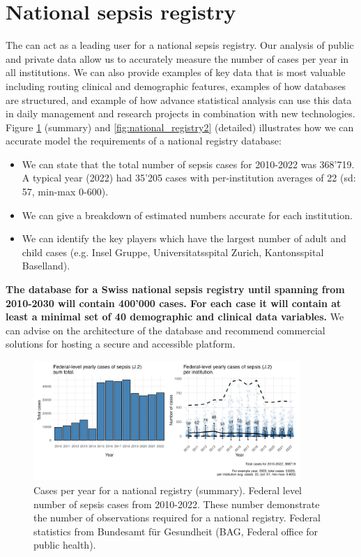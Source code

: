 

\section{National sepsis registry}
The \pmu can act as a leading user for a national sepsis registry.
Our analysis of public and private data allow us to accurately measure the number of cases per year in all institutions.
We can also provide examples of key data that is most valuable including routing clinical and demographic features, examples of how databases are structured, and example of how advance statistical analysis can use this data in daily management and research projects in combination with new technologies. 
Figure 
\ref{fig:national_registry1} (summary) and \ref{fig:national_registry2} (detailed)
 illustrates how we can accurate model the requirements of a national registry database:

\begin{itemize}
\item We can state that the total number of sepsis cases for 2010-2022 was 368'719. A typical year (2022) had 35'205 cases with per-institution averages of 22 (sd: 57, min-max 0-600).
\item We can give a breakdown of estimated numbers accurate for each institution.
\item We can identify the key players which have the largest number of adult and child cases (e.g. Insel Gruppe, Universitatsspital Zurich, Kantonsspital Baselland).
\end{itemize}

\textbf{The database for a Swiss national sepsis registry until spanning from 2010-2030 will contain 400'000 cases. 
For each case it will contain at least a minimal set of 40 demographic and clinical data variables.}
We can advise on the architecture of the database and recommend commercial solutions for hosting a secure and accessible platform.

\begin{figure}[h] \hspace*{0cm} 
\begin{center}
	\includegraphics[width=0.90\textwidth]{../stats/foph_key_stats/output/p_patch_tally_main}
	\caption{Cases per year for a national registry (summary). Federal level number of sepsis cases from 2010-2022. These number demonstrate the number of observations required for a national registry. Federal statistics from Bundesamt für Gesundheit (BAG, Federal office for public health).}
	\label{fig:national_registry1}
\end{center}
\end{figure}

